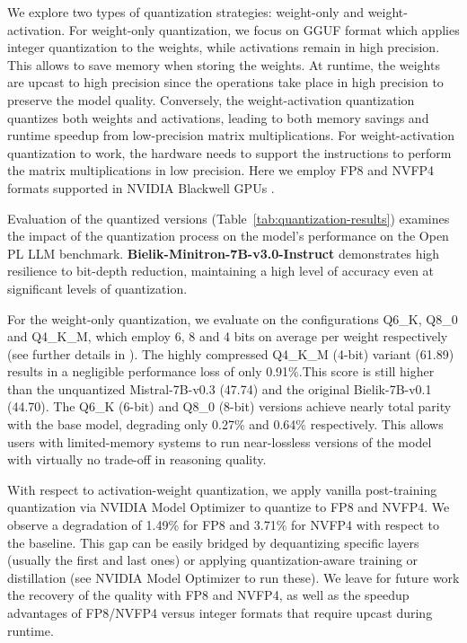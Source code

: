 \documentclass{article}
\begin{document}
We explore two types of quantization strategies: weight-only and weight-activation. For weight-only quantization, we focus on GGUF format \cite{quantization_gguf} which applies integer quantization to the weights, while activations remain in high precision. This allows to save memory when storing the weights. At runtime, the weights are upcast to high precision since the operations take place in high precision to preserve the model quality. Conversely, the weight-activation quantization quantizes both weights and activations, leading to both memory savings and runtime speedup from low-precision matrix multiplications. For weight-activation quantization to work, the hardware needs to support the instructions to perform the matrix multiplications in low precision. Here we employ FP8 and NVFP4 formats supported in NVIDIA Blackwell GPUs \cite{quantization_nvfp4}.

Evaluation of the quantized versions (Table~\ref{tab:quantization-results}) examines the impact of the quantization process on the model's performance on the Open PL LLM benchmark. \textbf{Bielik-Minitron-7B-v3.0-Instruct} demonstrates high resilience to bit-depth reduction, maintaining a high level of accuracy even at significant levels of quantization.

For the weight-only quantization, we evaluate on the configurations Q6\_K, Q8\_0 and Q4\_K\_M, which employ 6, 8 and 4 bits on average per weight respectively (see further details in \cite{quantization_gguf}). The highly compressed Q4\_K\_M (4-bit) variant (61.89) results in a negligible performance loss of only 0.91\%.This score is still higher than the unquantized Mistral-7B-v0.3 (47.74) and the original Bielik-7B-v0.1 (44.70). 
 The Q6\_K (6-bit) and Q8\_0 (8-bit) versions achieve nearly total parity with the base model, degrading only 0.27\% and 0.64\% respectively. This allows users with limited-memory systems to run near-lossless versions of the model with virtually no trade-off in reasoning quality.

With respect to activation-weight quantization, we apply vanilla post-training quantization via NVIDIA Model Optimizer \cite{quantization_modelopt} to quantize to FP8 and NVFP4. We observe a degradation of 1.49\% for FP8 and 3.71\% for NVFP4 with respect to the baseline. This gap can be easily bridged by dequantizing specific layers (usually the first and last ones) or applying quantization-aware training or distillation \cite{xin2026quantization}(see NVIDIA Model Optimizer \cite{quantization_modelopt} to run these). We leave for future work the recovery of the quality with FP8 and NVFP4, as well as the speedup advantages of FP8/NVFP4 versus integer formats that require upcast during runtime.
\end{document}
